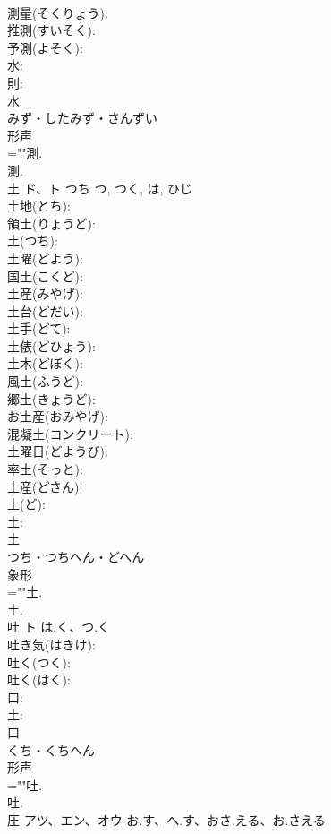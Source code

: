 \documentclass[8pt]{extreport}
\begin{document}
\begin{CJK}{UTF8}{min}
\\	測量(そくりょう): 
\\	推測(すいそく): 
\\	予測(よそく): 
\\	水: 
\\	則: 
\\	水	
\\	みず・したみず・さんずい	
\\	形声 
\\	=""測.
\\	測.
\\	土	ド、ト	つち	つ, つく, は, ひじ	
\\	土地(とち): 
\\	領土(りょうど): 
\\	土(つち): 
\\	土曜(どよう): 
\\	国土(こくど): 
\\	土産(みやげ): 
\\	土台(どだい): 
\\	土手(どて): 
\\	土俵(どひょう): 
\\	土木(どぼく): 
\\	風土(ふうど): 
\\	郷土(きょうど): 
\\	お土産(おみやげ): 
\\	混凝土(コンクリート): 
\\	土曜日(どようび): 
\\	率土(そっと): 
\\	土産(どさん): 
\\	土(ど): 
\\	土: 
\\	土	
\\	つち・つちへん・どへん	
\\	象形 
\\	=""土.
\\	土.
\\	吐	ト	は.く、つ.く		
\\	吐き気(はきけ): 
\\	吐く(つく): 
\\	吐く(はく): 
\\	口: 
\\	土: 
\\	口	
\\	くち・くちへん	
\\	形声 
\\	=""吐.
\\	吐.
\\	圧	アツ、エン、オウ	お.す、へ.す、おさ.える、お.さえる		

\end{CJK}
\end{document}
